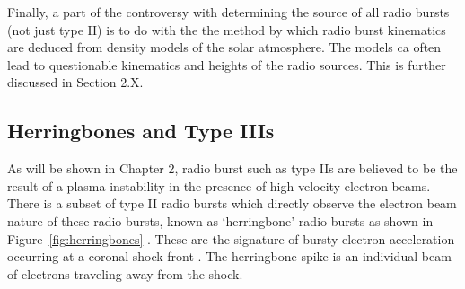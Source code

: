 Finally, a part of the controversy with determining the source of all radio bursts (not just type II) is to do with the the method by which radio burst kinematics are deduced from density models of the solar atmosphere. The models ca often lead to questionable kinematics and heights of the radio sources. This is further discussed in Section 2.X.

\clearpage
\subsection{Herringbones and Type IIIs}

As will be shown in Chapter 2, radio burst such as type IIs are believed to be the result of a plasma instability in the presence of high velocity electron beams. There is a subset of type II radio bursts which directly observe the electron beam nature of these radio bursts, known as `herringbone' radio bursts as shown in Figure~\ref{fig:herringbones} \citep{cairns1987, cane1998}. These are the signature of bursty electron acceleration occurring at a coronal shock front \citep{mann2005}. The herringbone spike is an individual beam of electrons traveling away from the shock. 

